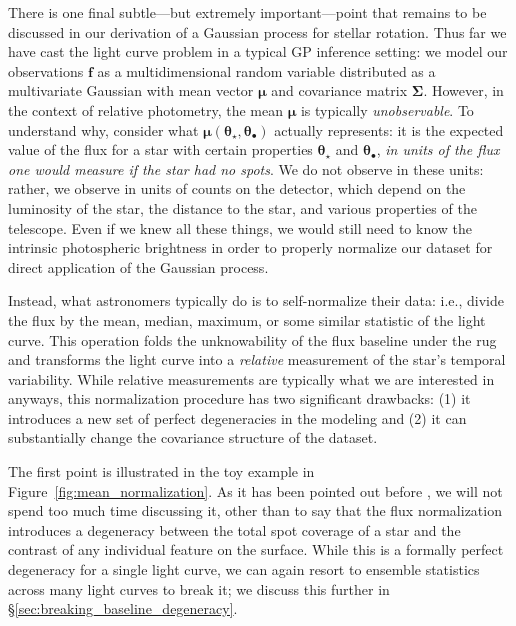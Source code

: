 \documentclass[modern]{aastex62}
\begin{document}
There is one final subtle---but extremely important---point that remains to
be discussed in our derivation of a Gaussian process for stellar
rotation. Thus far we have cast the light curve problem in a typical GP inference
setting: we model our observations $\mathbf{f}$ as
a multidimensional random variable distributed as a multivariate Gaussian with mean vector
$\pmb{\mu}$ and covariance matrix $\pmb{\Sigma}$. However, in the context of
relative photometry, the mean $\pmb{\mu}$ is typically \emph{unobservable}.
%
To understand why, consider what
$\pmb{\mu}(\pmb{\theta}_\star, \pmb{\theta}_\bullet)$ actually represents:
it is the expected value
of the flux
for a star with certain properties $\pmb{\theta}_\star$ and $\pmb{\theta}_\bullet$,
\emph{in units of the flux one would measure if the star had no spots}.
We do not observe in these units: rather, we observe in units of counts on
the detector, which depend on the luminosity of the star, the distance to
the star, and various properties of the telescope. Even if we knew all these
things, we would still need to know the intrinsic photospheric brightness
in order to properly normalize our dataset for direct application of
the Gaussian process.

Instead, what astronomers typically do is to self-normalize their data:
i.e., divide the flux by the mean, median, maximum, or some similar
statistic of the light curve. This operation folds the unknowability of
the flux baseline under the rug and transforms the light curve into a \emph{relative}
measurement of the star's temporal variability. While relative measurements
are typically what we are interested in anyways, this normalization procedure
has two significant drawbacks: (1) it introduces a new set of perfect degeneracies
in the modeling and (2) it can substantially change the covariance structure
of the dataset.

The first point is illustrated in the toy example in
Figure~\ref{fig:mean_normalization}. As it has been pointed out before ,
we will not spend too much time discussing it, other than to say that the
flux normalization introduces a degeneracy between the total spot coverage
of a star and the contrast of any individual feature on the surface.
While this is a formally perfect degeneracy for a single light curve, we can
again resort to ensemble statistics across many light curves to break it;
we discuss this further in \S\ref{sec:breaking_baseline_degeneracy}.
\end{document}
